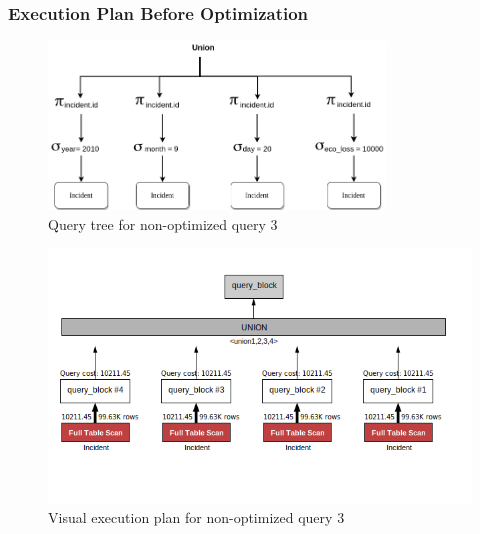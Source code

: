\subsubsection{Execution Plan Before Optimization}
\begin{figure}[H]
    \centering
    \includegraphics[width=0.8\textwidth]{images/query_trees/query3-optimized-and-non-optimized.png}
    \caption{Query tree for non-optimized query 3}
\end{figure}
\begin{figure}[H]
    \centering
    \includegraphics[width=\textwidth]{images/execution_plans/q3-1-old.png}
    \caption{Visual execution plan for non-optimized query 3}
\end{figure}

